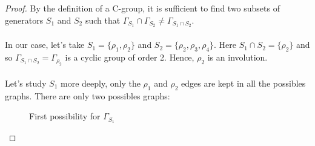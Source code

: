 \begin{proof}
  By the definition of a C-group, it is sufficient to find two subsets of generators $S_1$ and $S_2$ such that $\Gamma_{S_1} \cap \Gamma_{S_2} \neq \Gamma_{S_1 \cap S_2}$.

  \paragraph{}
  In our case, let's take $S_1 = \{\rho_1, \rho_2\}$ and $S_2 = \{\rho_2, \rho_3, \rho_4\}$. Here $S_1 \cap S_2 = \{\rho_2\}$ and so $\Gamma_{S_1 \cap S_2} = \Gamma_{\rho_2}$ is a cyclic group of order 2. Hence, $\rho_2$ is an involution.

  \paragraph{}
  Let's study $S_1$ more deeply, only the $\rho_1$ and $\rho_2$ edges are kept in all the possibles graphs. There are only two possibles graphs:

  \begin{figure}[H]
    \begin{center}
      \caption{First possibility for $\Gamma_{S_1}$}
    \end{center}
  \end{figure}


\end{proof}
